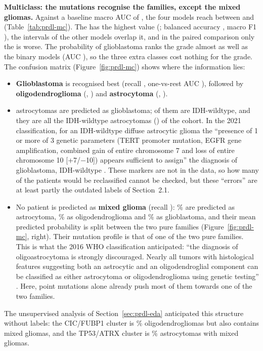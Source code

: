 \textbf{Multiclass: the mutations recognise the families, except the mixed gliomas.} Against a baseline
macro AUC of \McBaseAUC, the four models reach between \McMinAUC{} and \McMaxAUC{}
(Table~\ref{tab:prdl-mc}). The \McBest{} has the highest value (\McBestAUC; balanced accuracy
\McBestBAcc, macro F1 \McBestFOne), the intervals of the \McNTies{} other models overlap it, and in the
paired comparison only the \McWorse{} is worse. The probability of glioblastoma ranks the grade almost as
well as the binary models (AUC \McGradeAUC), so the three extra classes cost nothing for the grade. The
confusion matrix (Figure~\ref{fig:prdl-mc}) shows where the information lies:
\begin{itemize}
  \item \textbf{Glioblastoma} is recognised best (recall \McRecallGBM, one-vs-rest AUC \McAUCGBM),
        followed by \textbf{oligodendroglioma} (\McRecallOligo, \McAUCOligo) and \textbf{astrocytoma}
        (\McRecallAstro, \McAUCAstro).
  \item \McAstroAsGBM{} astrocytomas are predicted as glioblastoma; \McAstroGBMwt{} of them are
        IDH-wildtype, and they are all the IDH-wildtype astrocytomas (\McAstroWtTotal) of the cohort.
        In the 2021 classification, for an IDH-wildtype diffuse astrocytic glioma the ``presence of 1 or
        more of 3 genetic parameters (TERT promoter mutation, EGFR gene amplification, combined gain of
        entire chromosome 7 and loss of entire chromosome 10 [+7/$-$10]) appears sufficient to assign''
        the diagnosis of glioblastoma, IDH-wildtype \cite{louis2021}. These markers are not in the data,
        so how many of the \McAstroGBMwt{} patients would be reclassified cannot be checked, but these
        ``errors'' are at least partly the outdated labels of Section~2.1.
  \item No patient is predicted as \textbf{mixed glioma} (recall \McRecallMixed): \McMixedAsAstro\% are
        predicted as astrocytoma, \McMixedAsOligo\% as oligodendroglioma and \McMixedAsGBM\% as
        glioblastoma, and their mean predicted probability is split between the two pure families
        (Figure~\ref{fig:prdl-mc}, right). Their mutation profile is that of one of the two pure
        families. This is what the 2016 WHO classification anticipated: ``the diagnosis of
        oligoastrocytoma is strongly discouraged. Nearly all tumors with histological features suggesting
        both an astrocytic and an oligodendroglial component can be classified as either astrocytoma or
        oligodendroglioma using genetic testing'' \cite{louis2016}. Here, point mutations alone already
        push most of them towards one of the two families.
\end{itemize}
The unsupervised analysis of Section~\ref{sec:prdl-eda} anticipated this structure without labels: the
CIC/FUBP1 cluster is \McCThreeOligo\% oligodendrogliomas but also contains \McCThreeMixed{} mixed
gliomas, and the TP53/ATRX cluster is \McCTwoAstro\% astrocytomas with \McCTwoMixed{} mixed gliomas.

